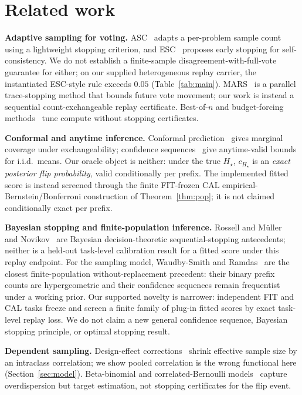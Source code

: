\documentclass{article}
\theoremstyle{definition}
\theoremstyle{remark}
\newcommand{\trueH}{H_\star}
\newcommand{\oraclecert}{c_{\trueH}}
\begin{document}
\section{Related work}
\label{sec:related}

\textbf{Adaptive sampling for voting.} ASC~\citep{aggarwal2023asc} adapts a
per-problem sample count using a lightweight stopping criterion, and
ESC~\citep{li2024esc} proposes early stopping for self-consistency. We do not
establish a finite-sample disagreement-with-full-vote guarantee for either;
on our supplied heterogeneous replay carrier, the instantiated ESC-style rule
exceeds $0.05$ (Table~\ref{tab:main}). MARS~\citep{chen2026mars} is a
parallel trace-stopping method that bounds future vote movement; our work is
instead a sequential count-exchangeable replay certificate. Best-of-$n$ and budget-forcing
methods~\citep{snell2024scaling} tune compute without stopping certificates.

\textbf{Conformal and anytime inference.} Conformal
prediction~\citep{vovk2005algorithmic} gives marginal coverage under
exchangeability; confidence sequences~\citep{howard2021cs} give anytime-valid
bounds for i.i.d.\ means. Our oracle object is neither: under the true
$\trueH$, $\oraclecert$ is an \emph{exact posterior flip probability}, valid
conditionally per prefix. The implemented fitted score is instead screened
through the finite FIT-frozen CAL empirical-Bernstein/Bonferroni construction
of Theorem~\ref{thm:pop}; it is not claimed conditionally exact per prefix.

\textbf{Bayesian stopping and finite-population inference.} Rossell and
M\"uller~\citep{RossellMuller2013SequentialStopping} and
Novikov~\citep{Novikov2010OptimalSequential} are Bayesian
decision-theoretic sequential-stopping antecedents; neither is a held-out
task-level calibration result for a fitted score under this replay endpoint.
For the sampling model, Waudby-Smith and
Ramdas~\citep{WaudbySmithRamdas2020Confidence} are the closest
finite-population without-replacement precedent: their binary prefix counts
are hypergeometric and their confidence sequences remain frequentist under a
working prior. Our supported novelty is narrower: independent FIT and CAL
tasks freeze and screen a finite family of plug-in fitted scores by exact
task-level replay loss. We do not claim a new general confidence sequence,
Bayesian stopping principle, or optimal stopping result.

\textbf{Dependent sampling.} Design-effect corrections~\citep{kish1965deff}
shrink effective sample size by an intraclass correlation; we show pooled
correlation is the wrong functional here (Section~\ref{sec:model}).
Beta-binomial and correlated-Bernoulli
models~\citep{skellam1948betabinomial} capture overdispersion but target
estimation, not stopping certificates for the flip event.
\end{document}
